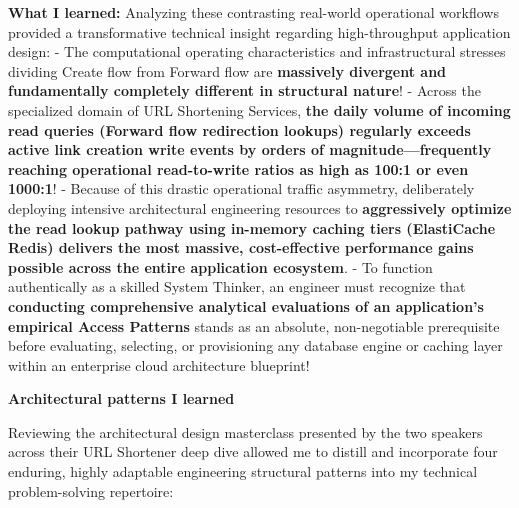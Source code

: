 \textbf{What I learned:} Analyzing these contrasting real-world
operational workflows provided a transformative technical insight
regarding high-throughput application design: - The computational
operating characteristics and infrastructural stresses dividing Create
flow from Forward flow are \textbf{massively divergent and fundamentally
completely different in structural nature}! - Across the specialized
domain of URL Shortening Services, \textbf{the daily volume of incoming
read queries (Forward flow redirection lookups) regularly exceeds active
link creation write events by orders of magnitude---frequently reaching
operational read-to-write ratios as high as 100:1 or even 1000:1}! -
Because of this drastic operational traffic asymmetry, deliberately
deploying intensive architectural engineering resources to
\textbf{aggressively optimize the read lookup pathway using in-memory
caching tiers (ElastiCache Redis) delivers the most massive,
cost-effective performance gains possible across the entire application
ecosystem}. - To function authentically as a skilled System Thinker, an
engineer must recognize that \textbf{conducting comprehensive analytical
evaluations of an application's empirical Access Patterns} stands as an
absolute, non-negotiable prerequisite before evaluating, selecting, or
provisioning any database engine or caching layer within an enterprise
cloud architecture blueprint!

\vspace{0.5em}\noindent\textbf{Architectural patterns I
learned}\par

Reviewing the architectural design masterclass presented by the two
speakers across their URL Shortener deep dive allowed me to distill and
incorporate four enduring, highly adaptable engineering structural
patterns into my technical problem-solving repertoire:

